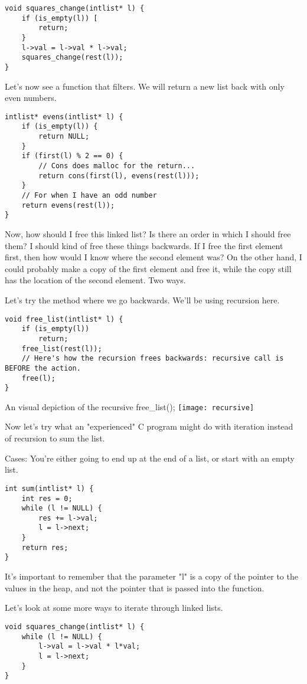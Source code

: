 \documentclass[12pt]{article}
\theoremstyle{definition}
\begin{document}
\begin{lstlisting}
void squares_change(intlist* l) {
    if (is_empty(l)) [
        return; 
    }
    l->val = l->val * l->val;
    squares_change(rest(l));
}
\end{lstlisting}
Let's now see a function that filters. We will return a new list back with only even numbers. 
\begin{lstlisting}
intlist* evens(intlist* l) {
    if (is_empty(l)) {
        return NULL;
    }
    if (first(l) % 2 == 0) {
        // Cons does malloc for the return...
        return cons(first(l), evens(rest(l)));
    }
    // For when I have an odd number
    return evens(rest(l));
}
\end{lstlisting}
Now, how should I free this linked list? Is there an order in which I should free them? I should kind of free these things backwards. If I free the first element first, then how would I know where the second element was? On the other hand, I could probably make a copy of the first element and free it, while the copy still has the location of the second element. Two ways.

Let's try the method where we go backwards. We'll be using recursion here.
\begin{lstlisting}
void free_list(intlist* l) {
    if (is_empty(l))
        return;
    free_list(rest(l));
    // Here's how the recursion frees backwards: recursive call is BEFORE the action.
    free(l);
}
\end{lstlisting}

\begin{center}
An visual depiction of the recursive free\_list();
    \texttt{[image: recursive]}
\end{center}


Now let's try what an "experienced" C program might do with iteration instead of recursion to sum the list. 

Cases: You're either going to end up at the end of a list, or start with an empty list. 
\begin{lstlisting}
int sum(intlist* l) {
    int res = 0;
    while (l != NULL) {
        res += l->val;
        l = l->next;
    }
    return res;
}
\end{lstlisting}
It's important to remember that the parameter "l" is a copy of the pointer to the values in the heap, and not the pointer that is passed into the function. 

Let's look at some more ways to iterate through linked lists.
\begin{lstlisting}
void squares_change(intlist* l) {
    while (l != NULL) {
        l->val = l->val * l*val;
        l = l->next;
    }
}
\end{lstlisting}
\end{document}
